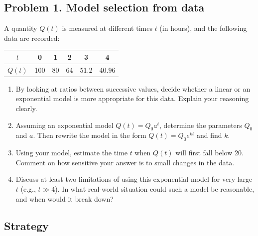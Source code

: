 \subsection{Problem 1. Model selection from data}
A quantity $Q(t)$ is measured at different times $t$ (in hours), and the following data are recorded:

\begin{center}
\begin{tabular}{c|ccccc}

$t$ & 0 & 1 & 2 & 3 & 4 \\
\hline
$Q(t)$ & 100 & 80 & 64 & 51.2 & 40.96 \\

\end{tabular}
\end{center}

\begin{enumerate}[label=(\alph*)]
    \item By looking at ratios between successive values, decide whether a linear or an exponential model is more appropriate for this data. Explain your reasoning clearly.
    \item Assuming an exponential model $Q(t) = Q_{0}a^{t}$, determine the parameters $Q_{0}$ and $a$. Then rewrite the model in the form $Q(t) = Q_{0}e^{kt}$ and find $k$.
    \item Using your model, estimate the time $t$ when $Q(t)$ will first fall below 20. Comment on how sensitive your answer is to small changes in the data.
    \item Discuss at least two limitations of using this exponential model for very large $t$ (e.g., $t \gg 4$). In what real-world situation could such a model be reasonable, and when would it break down?
\end{enumerate}

\subsection*{Strategy}

